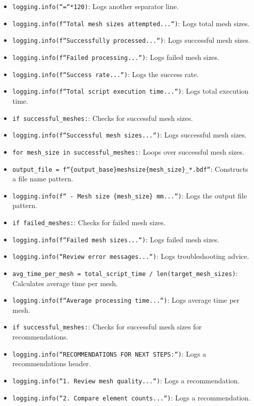 \documentclass{book}
\begin{document}
\begin{itemize}[leftmargin=*,label=\textbullet]
\begin{itemize}
    \item \texttt{logging.info(``=``*120)}: Logs another separator line.
    \item \texttt{logging.info(f``Total mesh sizes attempted...``)}: Logs total mesh sizes.
    \item \texttt{logging.info(f``Successfully processed...``)}: Logs successful mesh sizes.
    \item \texttt{logging.info(f``Failed processing...``)}: Logs failed mesh sizes.
    \item \texttt{logging.info(f``Success rate...``)}: Logs the success rate.
    \item \texttt{logging.info(f``Total script execution time...``)}: Logs total execution time.
    \item \texttt{if successful\_meshes:}: Checks for successful mesh sizes.
    \item \texttt{logging.info(f``Successful mesh sizes...``)}: Logs successful mesh sizes.
    \item \texttt{for mesh\_size in successful\_meshes:}: Loops over successful mesh sizes.
    \item \texttt{output\_file = f``\{output\_base\}meshsize\{mesh\_size\}\_*.bdf``}: Constructs a file name pattern.
    \item \texttt{logging.info(f``  - Mesh size \{mesh\_size\} mm...``)}: Logs the output file pattern.
    \item \texttt{if failed\_meshes:}: Checks for failed mesh sizes.
    \item \texttt{logging.info(f``Failed mesh sizes...``)}: Logs failed mesh sizes.
    \item \texttt{logging.info(``Review error messages...``)}: Logs troubleshooting advice.
    \item \texttt{avg\_time\_per\_mesh = total\_script\_time / len(target\_mesh\_sizes)}: Calculates average time per mesh.
    \item \texttt{logging.info(f``Average processing time...``)}: Logs average time per mesh.
    \item \texttt{if successful\_meshes:}: Checks for successful mesh sizes for recommendations.
    \item \texttt{logging.info(``RECOMMENDATIONS FOR NEXT STEPS:``)}: Logs a recommendations header.
    \item \texttt{logging.info(``1. Review mesh quality...``)}: Logs a recommendation.
    \item \texttt{logging.info(``2. Compare element counts...``)}: Logs a recommendation.

\end{itemize}
\end{itemize}
\end{document}

